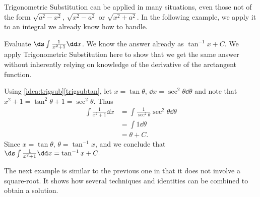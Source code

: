 Trigonometric Substitution can be applied in many situations, even those not of the form $\sqrt{a^2-x^2}$, $\sqrt{x^2-a^2}$ or $\sqrt{x^2+a^2}$. In the following example, we apply it to an integral we already know how to handle.

\begin{example}\label{ex_trigsub5}
Evaluate $\ds \int\frac1{x^2+1}\dd x$.
\solution
We know the answer already as $\tan^{-1}x+C$. We apply Trigonometric Substitution here to show that we get the same answer without inherently relying on knowledge of the derivative of the arctangent function.

Using \autoref{idea:trigsub}\ref*{trigsubtan}, let $x=\tan\theta$, $\dd x=\sec^2\theta\dd\theta$ and note that $x^2+1 = \tan^2\theta+1 = \sec^2\theta$. Thus
\begin{align*}
\int \frac1{x^2+1}\dd x &= \int \frac{1}{\sec^2\theta}\sec^2\theta\dd\theta \\
			&= \int 1\dd\theta\\
			&= \theta + C.
\end{align*}
Since $x=\tan \theta$, $\theta = \tan^{-1}x$, and we conclude that $\ds \int\frac1{x^2+1}\dd x = \tan^{-1}x+C.$
\end{example}

The next example is similar to the previous one in that it does not involve a square-root. It shows how several techniques and identities can be combined to obtain a solution.

